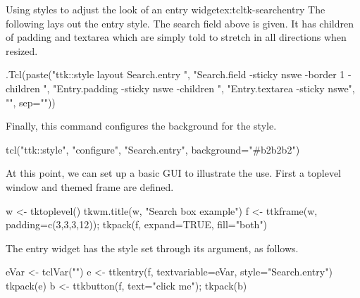 \begin{example}{Using styles to adjust the look of an entry widget}{ex:tcltk-searchentry}
The following lays out the entry style. The search field above is given. It has children of padding and textarea which are simply told to stretch in all directions when resized.
\begin{Schunk}
\begin{Sinput}
 .Tcl(paste("ttk::style layout Search.entry {",
            "Search.field -sticky nswe -border 1 -children {",
            "Entry.padding -sticky nswe -children {",
            "Entry.textarea -sticky nswe",
            "}}}",
            sep="\n"))
\end{Sinput}
\end{Schunk}
Finally, this command configures the background for the  style.
\begin{Schunk}
\begin{Sinput}
 tcl("ttk::style", "configure", "Search.entry", 
     background="#b2b2b2")
\end{Sinput}
\end{Schunk}

At this point, we can set up a basic GUI to illustrate the use. First a toplevel window and themed frame are defined.
\begin{Schunk}
\begin{Sinput}
 w <- tktoplevel()
 tkwm.title(w, "Search box example")
 f <- ttkframe(w, padding=c(3,3,3,12)); tkpack(f, expand=TRUE, fill="both")
\end{Sinput}
\end{Schunk}

The entry widget has the style set through its  argument, as follows.
\begin{Schunk}
\begin{Sinput}
 eVar <- tclVar("")
 e <- ttkentry(f, textvariable=eVar, style="Search.entry")
 tkpack(e)
 b <- ttkbutton(f, text="click me"); tkpack(b)
\end{Sinput}
\end{Schunk}


\end{example}
